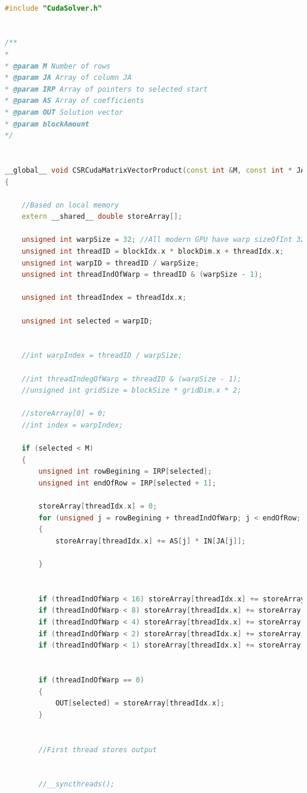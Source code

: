 \documentclass{scrreprt}
\begin{document}
\begin{lstlisting}[language=C++, caption=CudaSolver.cu]

#include "CudaSolver.h"


/**
*
* @param M Number of rows
* @param JA Array of column JA
* @param IRP Array of pointers to selected start
* @param AS Array of coefficients
* @param OUT Solution vector
* @param blockAmount
*/


__global__ void CSRCudaMatrixVectorProduct(const int &M, const int * JA, const int * IRP, const double * AS, double * IN, double * OUT)
{

	//Based on local memory
	extern __shared__ double storeArray[];

	unsigned int warpSize = 32; //All modern GPU have warp sizeOfInt 32
	unsigned int threadID = blockIdx.x * blockDim.x + threadIdx.x;
	unsigned int warpID = threadID / warpSize;
	unsigned int threadIndOfWarp = threadID & (warpSize - 1);

	unsigned int threadIndex = threadIdx.x;
	
	unsigned int selected = warpID;
		

	//int warpIndex = threadID / warpSize;

	//int threadIndegOfWarp = threadID & (warpSize - 1);
	//unsigned int gridSize = blockSize * gridDim.x * 2;

	//storeArray[0] = 0;
	//int index = warpIndex;

	if (selected < M)
	{
		unsigned int rowBegining = IRP[selected];
		unsigned int endOfRow = IRP[selected + 1];

		storeArray[threadIdx.x] = 0;
		for (unsigned j = rowBegining + threadIndOfWarp; j < endOfRow; j+= warpSize)
		{
			storeArray[threadIdx.x] += AS[j] * IN[JA[j]];
		
		}


		if (threadIndOfWarp < 16) storeArray[threadIdx.x] += storeArray[threadIdx.x + 16];
		if (threadIndOfWarp < 8) storeArray[threadIdx.x] += storeArray[threadIdx.x + 8];
		if (threadIndOfWarp < 4) storeArray[threadIdx.x] += storeArray[threadIdx.x + 4];
		if (threadIndOfWarp < 2) storeArray[threadIdx.x] += storeArray[threadIdx.x + 2];
		if (threadIndOfWarp < 1) storeArray[threadIdx.x] += storeArray[threadIdx.x + 1];


		if (threadIndOfWarp == 0)
		{
			OUT[selected] = storeArray[threadIdx.x];
		}

	
		//First thread stores output
		

		//__syncthreads();
		

\end{lstlisting}
\end{document}
